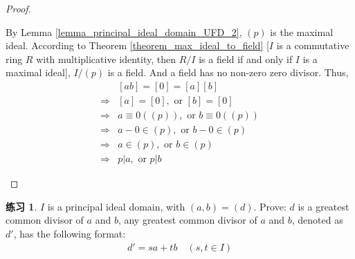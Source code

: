 \documentclass[utf8]{ctexbook}
\theoremstyle{definition}
\newtheorem{exercise}{练习}[section]
\begin{document}
\begin{proof}
\begin{enumerate}
{By Lemma \ref{lemma_principal_ideal_domain_UFD_2}, $(p)$ is the maximal ideal. According to Theorem \ref{theorem_max_ideal_to_field} [$I$ is a commutative ring $R$ with multiplicative identity, then $R/I$ is a field if and only if $I$ is a maximal ideal], $I/(p)$ is a field. And a field has no non-zero zero divisor. Thus,
\begin{align*}
& [ab] = [0] =[a][b] \\
\Longrightarrow & [a]= [0], \mbox{ or } [b] = [0] \\
\Longrightarrow & a \equiv 0 ((p)), \mbox{ or } b \equiv 0 ((p)) \\
\Longrightarrow & a - 0 \in (p), \mbox{ or } b - 0 \in (p) \\
\Longrightarrow & a \in (p), \mbox{ or } b \in (p) \\
\Longrightarrow & p | a , \mbox{ or } p | b
\end{align*}
}
\end{enumerate}


\end{proof}


\begin{exercise}\label{exercise_PID_1}
$I$ is a principal ideal domain, with $(a, b) = (d)$. Prove: $d$ is a greatest common divisor of $a$ and $b$, any greatest common divisor of $a$ and $b$, denoted as $d'$, has the following format:
\begin{align*}
d' = s a + t b \quad (s, t \in I) \label{eq_exercise_PID_1}
\end{align*} 
\end{exercise}
\end{document}
